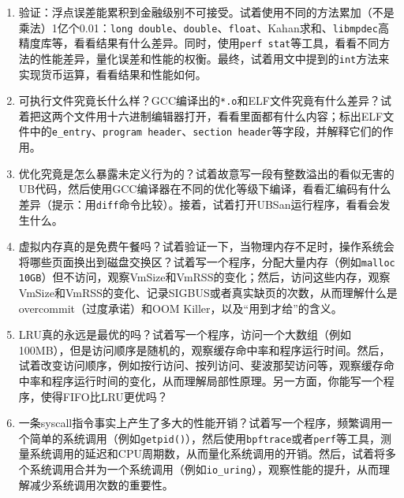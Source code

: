 \documentclass[../main.tex]{subfiles}
\begin{document}
\begin{thinking}
  \begin{enumerate}
    \item 验证：浮点误差能累积到金融级别不可接受。试着使用不同的方法累加（不是乘法）1亿个0.01：\texttt{long double}、\texttt{double}、\texttt{float}、Kahan求和、\texttt{libmpdec}高精度库等，看看结果有什么差异。同时，使用\texttt{perf stat}等工具，看看不同方法的性能差异，量化误差和性能的权衡。最终，试着用文中提到的\texttt{int}方法来实现货币运算，看看结果和性能如何。
    \item 可执行文件究竟长什么样？GCC编译出的\texttt{*.o}和ELF文件究竟有什么差异？试着把这两个文件用十六进制编辑器打开，看看里面都有什么内容；标出ELF文件中的\texttt{e\_entry}、\texttt{program header}、\texttt{section header}等字段，并解释它们的作用。
    \item 优化究竟是怎么暴露未定义行为的？试着故意写一段有整数溢出的看似无害的UB代码，然后使用GCC编译器在不同的优化等级下编译，看看汇编码有什么差异（提示：用\texttt{diff}命令比较）。接着，试着打开UBSan运行程序，看看会发生什么。
    \item 虚拟内存真的是免费午餐吗？试着验证一下，当物理内存不足时，操作系统会将哪些页面换出到磁盘交换区？试着写一个程序，分配大量内存（例如\texttt{malloc 10GB}）但不访问，观察VmSize和VmRSS的变化；然后，访问这些内存，观察VmSize和VmRSS的变化、记录SIGBUS或者真实缺页的次数，从而理解什么是overcommit（过度承诺）和OOM Killer，以及“用到才给”的含义。
    \item LRU真的永远是最优的吗？试着写一个程序，访问一个大数组（例如100MB），但是访问顺序是随机的，观察缓存命中率和程序运行时间。然后，试着改变访问顺序，例如按行访问、按列访问、斐波那契访问等，观察缓存命中率和程序运行时间的变化，从而理解局部性原理。另一方面，你能写一个程序，使得FIFO比LRU更优吗？
    \item 一条syscall指令事实上产生了多大的性能开销？试着写一个程序，频繁调用一个简单的系统调用（例如\texttt{getpid()}），然后使用\texttt{bpftrace}或者\texttt{perf}等工具，测量系统调用的延迟和CPU周期数，从而量化系统调用的开销。然后，试着将多个系统调用合并为一个系统调用（例如\texttt{io\_uring}），观察性能的提升，从而理解减少系统调用次数的重要性。
  \end{enumerate}
\end{thinking}
\end{document}
